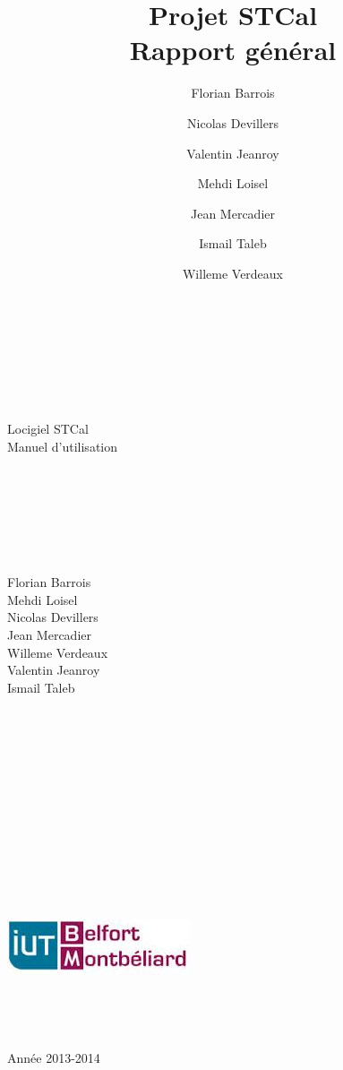 \documentclass[a4paper,10pt]{book}
\date{}
\title{\Huge{Projet STCal}\\ {\Large Rapport général}}
\author{Florian Barrois \and Nicolas Devillers \and Valentin Jeanroy \and Mehdi Loisel \and Jean Mercadier \and Ismail Taleb \and Willeme Verdeaux}
\begin{document}
 \begin{titlepage}

    \begin{center}
      ~\\~\\~\\~\\~\\
      \Huge
      Locigiel STCal\\
      \LARGE
      Manuel d'utilisation\\
      ~\\~\\~\\~\\~\\~\\
      \begin{multicols}{3}
	\large
	Florian Barrois\\Mehdi Loisel\\
	\columnbreak 
	Nicolas Devillers\\Jean Mercadier\\Willeme Verdeaux\\
	\columnbreak
	Valentin Jeanroy\\Ismail Taleb
      \end{multicols}
    \end{center}


    \begin{center}
    ~\\~\\~\\~\\~\\~\\~\\~\\~\\~\\~\\~\\
    \includegraphics{../general/iutbm.jpeg}
    ~\\~\\~\\~\\~\\
    \large
    Année 2013-2014
    \end{center}

    \end{titlepage}
\end{document}
